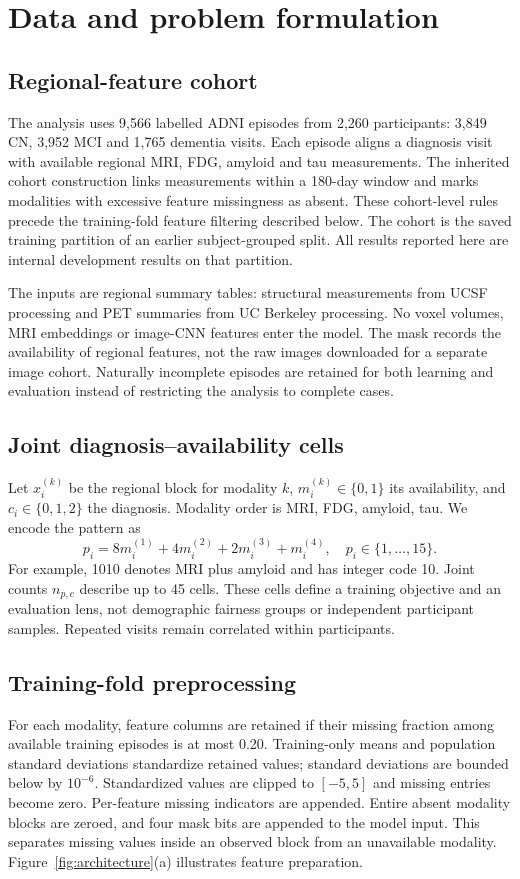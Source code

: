 \section{Data and problem formulation}\label{sec:data}
\subsection{Regional-feature cohort}
The analysis uses 9,566 labelled ADNI episodes from 2,260 participants: 3,849 CN, 3,952 MCI and 1,765 dementia visits. Each episode aligns a diagnosis visit with available regional MRI, FDG, amyloid and tau measurements. The inherited cohort construction links measurements within a 180-day window and marks modalities with excessive feature missingness as absent. These cohort-level rules precede the training-fold feature filtering described below. The cohort is the saved training partition of an earlier subject-grouped split. All results reported here are internal development results on that partition.

The inputs are regional summary tables: structural measurements from UCSF processing and PET summaries from UC Berkeley processing. No voxel volumes, MRI embeddings or image-CNN features enter the model. The mask records the availability of regional features, not the raw images downloaded for a separate image cohort. Naturally incomplete episodes are retained for both learning and evaluation instead of restricting the analysis to complete cases.

\subsection{Joint diagnosis--availability cells}
Let $x_i^{(k)}$ be the regional block for modality $k$, $m_i^{(k)}\in\{0,1\}$ its availability, and $c_i\in\{0,1,2\}$ the diagnosis. Modality order is MRI, FDG, amyloid, tau. We encode the pattern as
\begin{equation}
p_i=8m_i^{(1)}+4m_i^{(2)}+2m_i^{(3)}+m_i^{(4)},\quad p_i\in\{1,\ldots,15\}.
\end{equation}
For example, 1010 denotes MRI plus amyloid and has integer code 10. Joint counts $n_{p,c}$ describe up to 45 cells. These cells define a training objective and an evaluation lens, not demographic fairness groups or independent participant samples. Repeated visits remain correlated within participants.

\subsection{Training-fold preprocessing}
For each modality, feature columns are retained if their missing fraction among available training episodes is at most 0.20. Training-only means and population standard deviations standardize retained values; standard deviations are bounded below by $10^{-6}$. Standardized values are clipped to $[-5,5]$ and missing entries become zero. Per-feature missing indicators are appended. Entire absent modality blocks are zeroed, and four mask bits are appended to the model input. This separates missing values inside an observed block from an unavailable modality. Figure~\ref{fig:architecture}(a) illustrates feature preparation.

